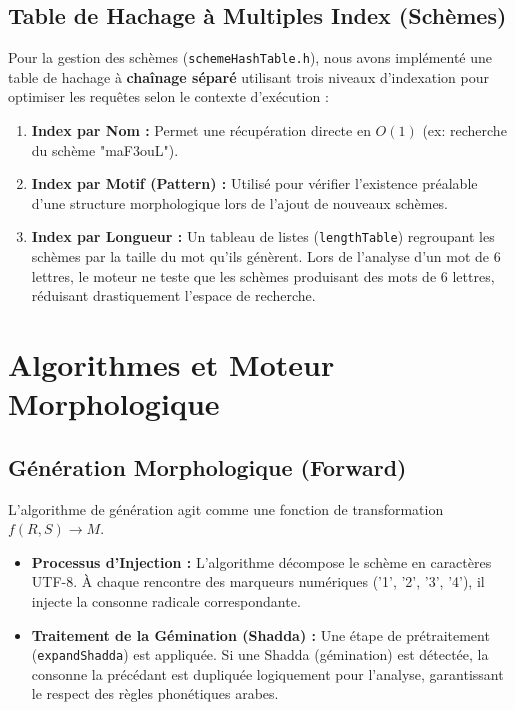 \documentclass[12pt,a4paper]{article}
\begin{document}
\subsection{Table de Hachage à Multiples Index (Schèmes)}
Pour la gestion des schèmes (\texttt{schemeHashTable.h}), nous avons implémenté une table de hachage à \textbf{chaînage séparé} utilisant trois niveaux d'indexation pour optimiser les requêtes selon le contexte d'exécution :
\begin{enumerate}[itemsep=2pt]
	\item \textbf{Index par Nom :} Permet une récupération directe en $O(1)$ (ex: recherche du schème "maF3ouL").
	\item \textbf{Index par Motif (Pattern) :} Utilisé pour vérifier l'existence préalable d'une structure morphologique lors de l'ajout de nouveaux schèmes.
	\item \textbf{Index par Longueur :} Un tableau de listes (\texttt{lengthTable}) regroupant les schèmes par la taille du mot qu'ils génèrent. Lors de l'analyse d'un mot de 6 lettres, le moteur ne teste que les schèmes produisant des mots de 6 lettres, réduisant drastiquement l'espace de recherche.
\end{enumerate}

\section{Algorithmes et Moteur Morphologique}

\subsection{Génération Morphologique (Forward)}
L'algorithme de génération agit comme une fonction de transformation $f(R, S) \rightarrow M$.
\begin{itemize}[label=\textbullet, itemsep=2pt]
	\item \textbf{Processus d'Injection :} L'algorithme décompose le schème en caractères UTF-8. À chaque rencontre des marqueurs numériques ('1', '2', '3', '4'), il injecte la consonne radicale correspondante.
	\item \textbf{Traitement de la Gémination (Shadda) :} Une étape de prétraitement (\texttt{expandShadda}) est appliquée. Si une Shadda (gémination) est détectée, la consonne la précédant est dupliquée logiquement pour l'analyse, garantissant le respect des règles phonétiques arabes.
\end{itemize}
\end{document}
